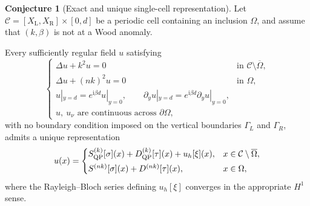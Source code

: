 \documentclass[11pt,fleqn]{article}
\newcommand{\ii}{\mathrm{i}}
\theoremstyle{definition}
\newtheorem{conjecture}{Conjecture}
\theoremstyle{remark}
\begin{document}
\begin{conjecture}[Exact and unique single-cell representation]
\label{conj:single-cell-representation}
Let
$
  \mathcal C=[X_\mathrm{L},X_\mathrm{R}]\times[0,d]
$
be a periodic cell containing an inclusion $\Omega$, and assume that
$(k,\beta)$ is not at a Wood anomaly.

Every sufficiently regular field $u$ satisfying
\[
\begin{cases}
\Delta u+k^2u=0
& \text{in }\mathcal C\setminus\overline{\Omega},\\
\Delta u+(nk)^2u=0
& \text{in }\Omega,\\
u|_{y=d}=e^{\ii\beta d}u|_{y=0},
\qquad
\partial_yu|_{y=d}
=e^{\ii\beta d}\partial_yu|_{y=0},\\
u,\ u_\nu \text{ are continuous across }\partial\Omega,
\end{cases}
\]
with no boundary condition imposed on the vertical boundaries
$\Gamma_L$ and $\Gamma_R$, admits a unique representation
\[
u(x)=
\begin{cases}
S_{\rm QP}^{(k)}[\sigma](x)
+D_{\rm QP}^{(k)}[\tau](x)
+u_h[\xi](x),
& x\in\mathcal C\setminus\overline{\Omega},\\[1mm]
S^{(nk)}[\sigma](x)
+D^{(nk)}[\tau](x),
& x\in\Omega,
\end{cases}
\]
where the Rayleigh--Bloch series defining $u_h[\xi]$ converges in the
appropriate $H^1$ sense.
\end{conjecture}
\end{document}
